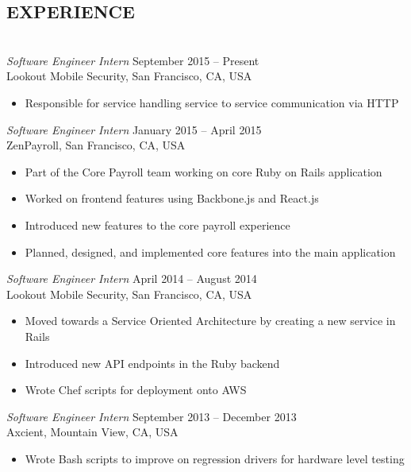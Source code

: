 \documentclass[a4paper, letterpaper]{res}
\begin{document}
\begin{resume}
\section{EXPERIENCE} 
				~\\[-2mm]
				{\sl Software Engineer Intern} \hspace*{3.15in}September 2015 -- Present \\
				Lookout Mobile Security, San Francisco, CA, USA
				\begin{itemize}
				\item Responsible for service handling service to service communication via HTTP
				\end{itemize}
				{\sl Software Engineer Intern} \hspace*{3.1in}January 2015 -- April 2015 \\
				ZenPayroll, San Francisco, CA, USA
				\begin{itemize} \itemsep -2pt
				\item Part of the Core Payroll team working on core Ruby on Rails application
				\item Worked on frontend features using Backbone.js and React.js
				\item Introduced new features to the core payroll experience
				\item Planned, designed, and implemented core features into the main application
				\end{itemize}
				{\sl Software Engineer Intern} \hspace*{3.1in}April 2014 -- August 2014 \\
				Lookout Mobile Security, San Francisco, CA, USA
				\begin{itemize} \itemsep -2pt
				\item Moved towards a Service Oriented Architecture by creating a new service in Rails
				\item Introduced new API endpoints in the Ruby backend
				\item Wrote Chef scripts for deployment onto AWS
				\end{itemize}
				{\sl Software Engineer Intern} \hspace*{2.6in}September 2013 -- December 2013  \\
				Axcient, Mountain View, CA, USA
                 \begin{itemize}  \itemsep -2pt %
                 \item Wrote Bash scripts to improve on regression drivers for hardware level testing

\end{itemize}
\end{resume}
\end{document}
